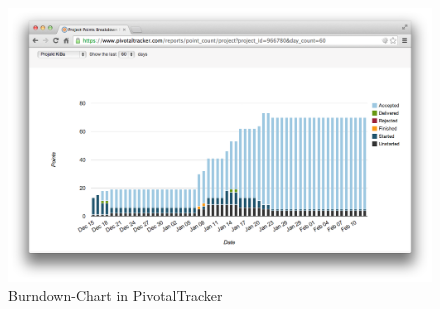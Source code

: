 \begin{figure}[h]
	\centering
	\includegraphics[scale=.3]{Pictures/TrackerBurndown}
	\vspace{-.8cm}
	\caption{Burndown-Chart in PivotalTracker\label{fig:TrackerBurndown}}
\end{figure}

